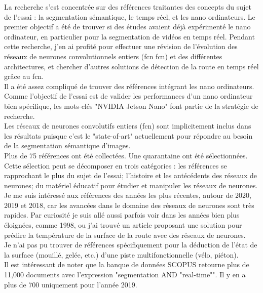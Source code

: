 ﻿\noindent La recherche s'est concentrée sur des références traitantes des concepts du sujet de l'essai : la segmentation sémantique, le temps réel, et les nano ordinateurs. Le premier objectif a été de trouver si des études avaient déjà expérimenté le nano ordinateur, en particulier pour la segmentation de vidéos en temps réel. Pendant cette recherche, j'en ai profité pour effectuer une révision de l'évolution des réseaux de neurones convolutionnels entiers (\acrshort{fcn} \acrlong{fcn})  et des différentes architectures, et chercher d'autres solutions de détection de la route en temps réel grâce au \acrshort{fcn}. 
\vspace{\baselineskip}
\\
\noindent Il a été assez compliqué de trouver des références intégrant les nano ordinateurs. Comme l'objectif de l'essai est de valider les performances d'un nano ordinateur bien spécifique, les mots-clés "NVIDIA Jetson Nano" font partie de la stratégie de recherche. 
\vspace{\baselineskip}
\\
\noindent Les réseaux de neurones convolutifs entiers (\acrshort{fcn}) sont implicitement inclus dans les résultats puisque c'est le "state-of-art" actuellement pour répondre au besoin de la segmentation sémantique d'images.
\vspace{\baselineskip}
\\
\noindent Plus de 75 références ont été collectées. Une quarantaine ont été sélectionnées. Cette sélection peut se décomposer en trois catégories : les références se rapprochant le plus du sujet de l'essai; l'histoire et les antécédents des réseaux de neurones; du matériel éducatif pour étudier et manipuler les réseaux de neurones.
\vspace{\baselineskip}
\\
\noindent Je me suis intéressé aux références des années les plus récentes, autour de 2020, 2019 et 2018, car les avancées dans le domaine des réseaux de neurones sont très rapides. Par curiosité je suis allé aussi parfois voir dans les années bien plus éloignées, comme 1998, ou j'ai trouvé un article proposant une solution pour prédire la température de la surface de la route avec des réseaux de neurones.
\vspace{\baselineskip}
\\
\noindent Je n'ai pas pu trouver de références spécifiquement pour la déduction de l'état de la surface (mouillé, gelée, etc.) d'une piste multifonctionnelle (vélo, piéton). 
\vspace{\baselineskip}
\\
\noindent Il est intéressant de noter que la banque de données SCOPUS retourne plus de 11,000 documents avec l'expression "segmentation AND "real-time"". Il y en a plus de 700 uniquement pour l'année 2019. 